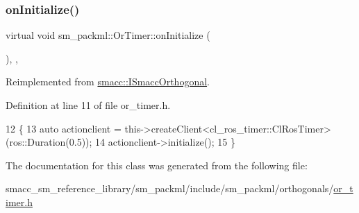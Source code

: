 \subsubsection{\texorpdfstring{on\+Initialize()}{onInitialize()}}
{\footnotesize\ttfamily virtual void sm\+\_\+packml\+::\+Or\+Timer\+::on\+Initialize (\begin{DoxyParamCaption}{ }\end{DoxyParamCaption})\hspace{0.3cm}{\ttfamily [inline]}, {\ttfamily [override]}, {\ttfamily [virtual]}}



Reimplemented from \hyperlink{classsmacc_1_1ISmaccOrthogonal_a6bb31c620cb64dd7b8417f8705c79c7a}{smacc\+::\+I\+Smacc\+Orthogonal}.



Definition at line 11 of file or\+\_\+timer.\+h.


\begin{DoxyCode}
12     \{
13         \textcolor{keyword}{auto} actionclient = this->createClient<cl\_ros\_timer::ClRosTimer>(ros::Duration(0.5));
14         actionclient->initialize();
15     \}
\end{DoxyCode}


The documentation for this class was generated from the following file\+:\begin{DoxyCompactItemize}
\item 
smacc\+\_\+sm\+\_\+reference\+\_\+library/sm\+\_\+packml/include/sm\+\_\+packml/orthogonals/\hyperlink{smacc__sm__reference__library_2sm__packml_2include_2sm__packml_2orthogonals_2or__timer_8h}{or\+\_\+timer.\+h}\end{DoxyCompactItemize}
